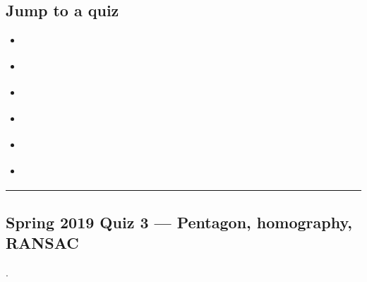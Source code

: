 \documentclass[letterpaper,11pt,english,openany,oneside]{jupyterBook}
\begin{document}
\subsection{Jump to a quiz}
\label{\detokenize{lectures/lecture03/quiz-workbook:jump-to-a-quiz}}\begin{itemize}
\item {}
\sphinxAtStartPar
{\hyperref[\detokenize{lectures/lecture03/quiz-workbook:quiz-source-7}]{}}

\item {}
\sphinxAtStartPar
{\hyperref[\detokenize{lectures/lecture03/quiz-workbook:quiz-source-10}]{}}

\item {}
\sphinxAtStartPar
{\hyperref[\detokenize{lectures/lecture03/quiz-workbook:quiz-source-11}]{}}

\item {}
\sphinxAtStartPar
{\hyperref[\detokenize{lectures/lecture03/quiz-workbook:quiz-source-14}]{}}

\item {}
\sphinxAtStartPar
{\hyperref[\detokenize{lectures/lecture03/quiz-workbook:quiz-source-15}]{}}

\item {}
\sphinxAtStartPar
{\hyperref[\detokenize{lectures/lecture03/quiz-workbook:quiz-source-a1}]{}}

\end{itemize}


\bigskip\hrule\bigskip



\subsection{Spring 2019 Quiz 3 — Pentagon, homography, RANSAC}
\label{\detokenize{lectures/lecture03/quiz-workbook:spring-2019-quiz-3-pentagon-homography-ransac}}\label{\detokenize{lectures/lecture03/quiz-workbook:quiz-source-7}}
\sphinxAtStartPar
{} .
\end{document}

